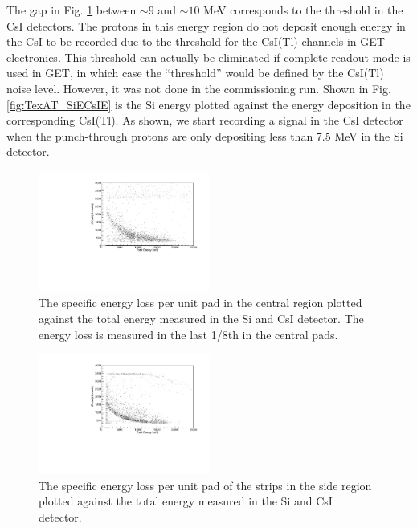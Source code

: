 \documentclass[final,number,sort&compress,5p,times,twocolumn]{elsarticle}
\begin{document}
The gap in Fig. \ref{fig:9C_dEE5} between $\sim 9$ and $\sim 10$ MeV corresponds to the threshold in the CsI detectors. The protons in this energy region do not deposit enough energy in the CsI to be recorded due to the threshold for the CsI(Tl) channels in GET electronics. This threshold can actually be eliminated if complete readout mode is used in GET, in which case the ``threshold'' would be defined by the CsI(Tl) noise level. However, it was not done in the commissioning run. Shown in Fig. \ref{fig:TexAT_SiECsIE} is the Si energy plotted against the energy deposition in the corresponding CsI(Tl). As shown, we start recording a signal in the CsI detector when the punch-through protons are only depositing less than 7.5 MeV in the Si detector.

\begin{figure}[hbt!]
	\centering
    \includegraphics[width=0.5\textwidth]{figures/9C_dETotalE_d5}
    \caption{The specific energy loss per unit pad in the central region plotted against the total energy measured in the Si and CsI detector. The energy loss is measured in the last 1/8th in the central pads.}
    \label{fig:9C_dEE5}
\end{figure}

\begin{figure}[hbt!]
	\centering
    \includegraphics[width=0.5\textwidth]{figures/9C_dETotalE_d9}
    \caption{The specific energy loss per unit pad of the strips in the side region plotted against the total energy measured in the Si and CsI detector.}
    \label{fig:9C_dEE9}
\end{figure}
\end{document}
